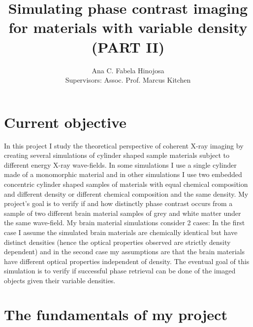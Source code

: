 \documentclass[9pt, a4paper]{article}
\title{Simulating phase contrast imaging for materials with variable density (PART II)}
\author{Ana C. Fabela Hinojosa \\
\small{Supervisors: Assoc. Prof. Marcus Kitchen}}
\begin{document}
\maketitle
\section{Current objective}
In this project I study the theoretical perspective of coherent X-ray imaging by creating several simulations of cylinder shaped sample materials subject to different energy X-ray wave-fields. In some simulations I use a single cylinder made of a monomorphic material and in other simulations I use two embedded concentric cylinder shaped samples of materials with equal chemical composition and different density or different chemical composition and the same density. 
My project's goal is to verify if and how distinctly phase contrast occurs from a sample of two different brain material samples of grey and white matter under the same wave-field. My brain material simulations consider 2 cases: In the first case I assume the simulated brain materials are chemically identical but have distinct densities (hence the optical properties observed are strictly density dependent) and in the second case my assumptions are that the brain materials have different optical properties independent of density.  
The eventual goal of this simulation is to verify if successful phase retrieval can be done of the imaged objects given their variable densities.

\section{The fundamentals of my project}
\end{document}
